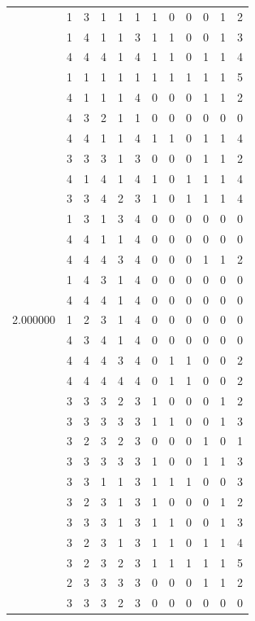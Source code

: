 \documentclass[]{book}
\theoremstyle{definition}
\theoremstyle{definition}
\theoremstyle{definition}
\theoremstyle{remark}
\begin{document}
\begin{table}
{\begin{tabular}[t]{rrrrrrrrrrrr}
 & 1 & 3 & 1 & 1 & 1 & 1 & 0 & 0 & 0 & 1 & 2\\
 & 1 & 4 & 1 & 1 & 3 & 1 & 1 & 0 & 0 & 1 & 3\\
 & 4 & 4 & 4 & 1 & 4 & 1 & 1 & 0 & 1 & 1 & 4\\
 & 1 & 1 & 1 & 1 & 1 & 1 & 1 & 1 & 1 & 1 & 5\\
 & 4 & 1 & 1 & 1 & 4 & 0 & 0 & 0 & 1 & 1 & 2\\
 & 4 & 3 & 2 & 1 & 1 & 0 & 0 & 0 & 0 & 0 & 0\\
 & 4 & 4 & 1 & 1 & 4 & 1 & 1 & 0 & 1 & 1 & 4\\
 & 3 & 3 & 3 & 1 & 3 & 0 & 0 & 0 & 1 & 1 & 2\\
 & 4 & 1 & 4 & 1 & 4 & 1 & 0 & 1 & 1 & 1 & 4\\
 & 3 & 3 & 4 & 2 & 3 & 1 & 0 & 1 & 1 & 1 & 4\\
 & 1 & 3 & 1 & 3 & 4 & 0 & 0 & 0 & 0 & 0 & 0\\
 & 4 & 4 & 1 & 1 & 4 & 0 & 0 & 0 & 0 & 0 & 0\\
 & 4 & 4 & 4 & 3 & 4 & 0 & 0 & 0 & 1 & 1 & 2\\
 & 1 & 4 & 3 & 1 & 4 & 0 & 0 & 0 & 0 & 0 & 0\\
 & 4 & 4 & 4 & 1 & 4 & 0 & 0 & 0 & 0 & 0 & 0\\
2.000000 & 1 & 2 & 3 & 1 & 4 & 0 & 0 & 0 & 0 & 0 & 0\\
 & 4 & 3 & 4 & 1 & 4 & 0 & 0 & 0 & 0 & 0 & 0\\
 & 4 & 4 & 4 & 3 & 4 & 0 & 1 & 1 & 0 & 0 & 2\\
 & 4 & 4 & 4 & 4 & 4 & 0 & 1 & 1 & 0 & 0 & 2\\
 & 3 & 3 & 3 & 2 & 3 & 1 & 0 & 0 & 0 & 1 & 2\\
 & 3 & 3 & 3 & 3 & 3 & 1 & 1 & 0 & 0 & 1 & 3\\
 & 3 & 2 & 3 & 2 & 3 & 0 & 0 & 0 & 1 & 0 & 1\\
 & 3 & 3 & 3 & 3 & 3 & 1 & 0 & 0 & 1 & 1 & 3\\
 & 3 & 3 & 1 & 1 & 3 & 1 & 1 & 1 & 0 & 0 & 3\\
 & 3 & 2 & 3 & 1 & 3 & 1 & 0 & 0 & 0 & 1 & 2\\
 & 3 & 3 & 3 & 1 & 3 & 1 & 1 & 0 & 0 & 1 & 3\\
 & 3 & 2 & 3 & 1 & 3 & 1 & 1 & 0 & 1 & 1 & 4\\
 & 3 & 2 & 3 & 2 & 3 & 1 & 1 & 1 & 1 & 1 & 5\\
 & 2 & 3 & 3 & 3 & 3 & 0 & 0 & 0 & 1 & 1 & 2\\
 & 3 & 3 & 3 & 2 & 3 & 0 & 0 & 0 & 0 & 0 & 0\\

\end{tabular}}
\end{table}
\end{document}
